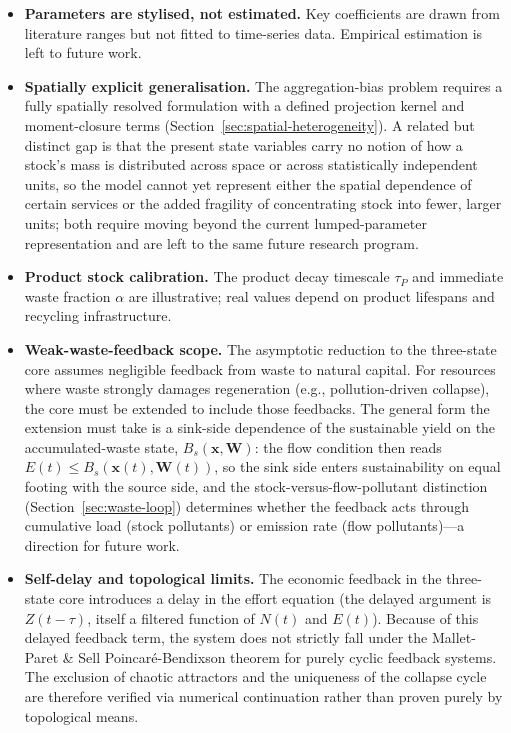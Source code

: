 \documentclass[twocolumn,10pt]{article}
\begin{document}
\begin{itemize}
\item \textbf{Parameters are stylised, not estimated.} Key coefficients are drawn from literature ranges but not fitted to time-series data. Empirical estimation is left to future work.
\item \textbf{Spatially explicit generalisation.} The aggregation-bias problem requires a fully spatially resolved formulation with a defined projection kernel and moment-closure terms (Section~\ref{sec:spatial-heterogeneity}). A related but distinct gap is that the present state variables carry no notion of how a stock's mass is distributed across space or across statistically independent units, so the model cannot yet represent either the spatial dependence of certain services or the added fragility of concentrating stock into fewer, larger units; both require moving beyond the current lumped-parameter representation and are left to the same future research program.
\item \textbf{Product stock calibration.} The product decay timescale \(\tau_P\) and immediate waste fraction \(\alpha\) are illustrative; real values depend on product lifespans and recycling infrastructure.
\item \textbf{Weak-waste-feedback scope.} The asymptotic reduction to the three-state core assumes negligible feedback from waste to natural capital. For resources where waste strongly damages regeneration (e.g., pollution-driven collapse), the core must be extended to include those feedbacks. The general form the extension must take is a sink-side dependence of the sustainable yield on the accumulated-waste state, $B_s(\mathbf x, \mathbf W)$: the flow condition then reads $E(t)\le B_s(\mathbf x(t),\mathbf W(t))$, so the sink side enters sustainability on equal footing with the source side, and the stock-versus-flow-pollutant distinction (Section~\ref{sec:waste-loop}) determines whether the feedback acts through cumulative load (stock pollutants) or emission rate (flow pollutants)---a direction for future work.
\item \textbf{Self-delay and topological limits.} The economic feedback in the three-state core introduces a delay in the effort equation (the delayed argument is \(Z(t-\tau)\), itself a filtered function of \(N(t)\) and \(E(t)\)). Because of this delayed feedback term, the system does not strictly fall under the Mallet-Paret \& Sell \cite{mallet1996} Poincaré-Bendixson theorem for purely cyclic feedback systems. The exclusion of chaotic attractors and the uniqueness of the collapse cycle are therefore verified via numerical continuation rather than proven purely by topological means.

\end{itemize}
\end{document}
